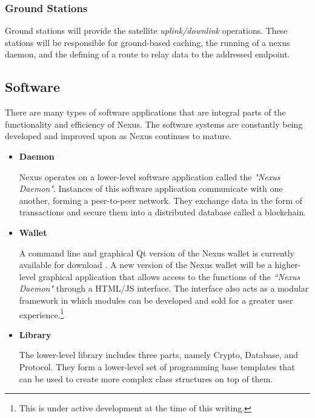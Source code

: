 \documentclass[11pt]{article}
\begin{document}
\subsubsection{Ground Stations}

Ground stations will provide the satellite \textit{uplink/downlink} operations. 
These stations will be responsible for ground-based caching, the running of a nexus daemon, and the defining of a route to relay data to the addressed endpoint.

\subsection{Software}

There are many types of software applications that are integral parts of the functionality and efficiency of Nexus. The software systems are constantly being developed and improved upon as Nexus continues to mature.

\begin{itemize}
\item \textbf{Daemon}

Nexus operates on a lower-level software application called the \textit{"Nexus Daemon"}.
Instances of this software application communicate with one another, forming a peer-to-peer network.
They exchange data in the form of transactions and secure them into a distributed database called a blockchain.

\item \textbf{Wallet}

A command line and graphical Qt version of the Nexus wallet is currently available for download \cite{githubnexusreleases} \cite{nexusearth}.
A new version of the Nexus wallet will be a higher-level graphical application that allows access to the functions of the \textit{``Nexus Daemon"} through a HTML/JS interface. 
The interface also acts as a modular framework in which modules can be developed and sold for a greater user experience.\footnote{This is under active development at the time of this writing.}

\item \textbf{Library}

The lower-level library includes three parts, namely Crypto, Database, and Protocol. 
They form a lower-level set of programming base templates that can be used to create more complex class structures on top of them. 

\end{itemize}
\end{document}
